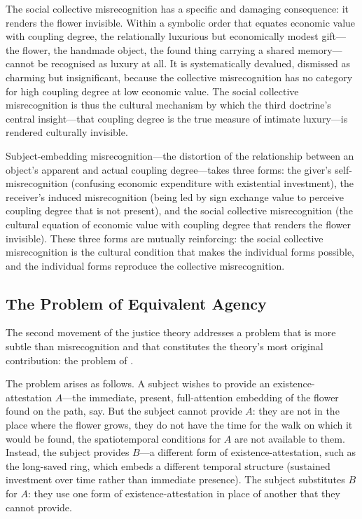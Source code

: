 The social collective misrecognition has a specific and damaging consequence: it renders the flower invisible. Within a symbolic order that equates economic value with coupling degree, the relationally luxurious but economically modest gift---the flower, the handmade object, the found thing carrying a shared memory---cannot be recognised as luxury at all. It is systematically devalued, dismissed as charming but insignificant, because the collective misrecognition has no category for high coupling degree at low economic value. The social collective misrecognition is thus the cultural mechanism by which the third doctrine's central insight---that coupling degree is the true measure of intimate luxury---is rendered culturally invisible.

\begin{claim}
Subject-embedding misrecognition---the distortion of the relationship between an object's apparent and actual coupling degree---takes three forms: the giver's self-misrecognition (confusing economic expenditure with existential investment), the receiver's induced misrecognition (being led by sign exchange value to perceive coupling degree that is not present), and the social collective misrecognition (the cultural equation of economic value with coupling degree that renders the flower invisible). These three forms are mutually reinforcing: the social collective misrecognition is the cultural condition that makes the individual forms possible, and the individual forms reproduce the collective misrecognition.
\end{claim}

\subsection{The Problem of Equivalent Agency}
\label{p16:subsec:equivalent_agency}

\noindent
The second movement of the justice theory addresses a problem that is more subtle than misrecognition and that constitutes the theory's most original contribution: the problem of .

The problem arises as follows. A subject wishes to provide an existence-attestation $A$---the immediate, present, full-attention embedding of the flower found on the path, say. But the subject cannot provide $A$: they are not in the place where the flower grows, they do not have the time for the walk on which it would be found, the spatiotemporal conditions for $A$ are not available to them. Instead, the subject provides $B$---a different form of existence-attestation, such as the long-saved ring, which embeds a different temporal structure (sustained investment over time rather than immediate presence). The subject substitutes $B$ for $A$: they use one form of existence-attestation in place of another that they cannot provide.

